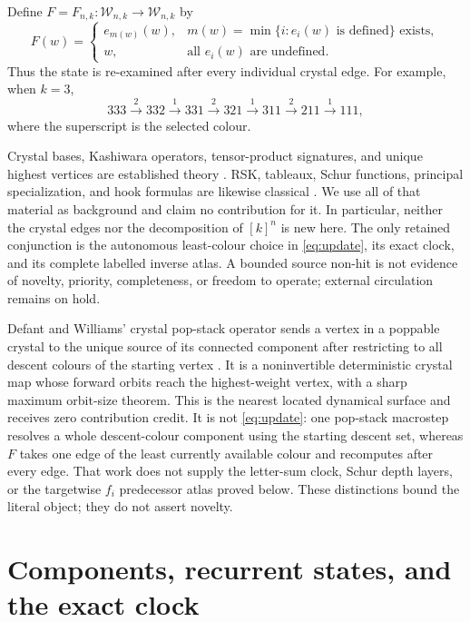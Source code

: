 \documentclass[a4paper,10pt]{amsart}
\theoremstyle{remark}
\newcommand{\Words}{\mathcal W}
\begin{document}
Define $F=F_{n,k}:\Words_{n,k}\to\Words_{n,k}$ by
\begin{equation}\label{eq:update}
 F(w)=
 \begin{cases}
 e_{m(w)}(w),&m(w)=\min\{i:e_i(w)\text{ is defined}\}\text{ exists},\\
 w,&\text{all }e_i(w)\text{ are undefined}.
 \end{cases}
\end{equation}
Thus the state is re-examined after every individual crystal edge.  For
example, when $k=3$,
\begin{equation}\label{eq:example}
333\xrightarrow{2}332\xrightarrow{1}331\xrightarrow{2}321
\xrightarrow{1}311\xrightarrow{2}211\xrightarrow{1}111,
\end{equation}
where the superscript is the selected colour.

Crystal bases, Kashiwara operators, tensor-product signatures, and unique
highest vertices are established theory
\cite{Kashiwara1991,BumpSchilling2017}.  RSK, tableaux, Schur functions,
principal specialization, and hook formulas are likewise classical
\cite{Fulton1997,Stanley2023,Sagan2001}.  We use all of that material as
background and claim no contribution for it.  In particular, neither the
crystal edges nor the decomposition of $[k]^n$ is new here.  The only retained
conjunction is the autonomous least-colour choice in \eqref{eq:update}, its
exact clock, and its complete labelled inverse atlas.  A bounded source
non-hit is not evidence of novelty, priority, completeness, or freedom to
operate; external circulation remains on hold.

Defant and Williams' crystal pop-stack operator sends a vertex in a poppable
crystal to the unique source of its connected component after restricting to
all descent colours of the starting vertex \cite{DefantWilliams2022}.  It is
a noninvertible deterministic crystal map whose forward orbits reach the
highest-weight vertex, with a sharp maximum orbit-size theorem.  This is the
nearest located dynamical surface and receives zero contribution credit.  It
is not \eqref{eq:update}: one pop-stack macrostep resolves a whole
descent-colour component using the starting descent set, whereas $F$ takes
one edge of the least currently available colour and recomputes after every
edge.  That work does not supply the letter-sum clock, Schur depth layers, or
the targetwise $f_i$ predecessor atlas proved below.  These distinctions
bound the literal object; they do not assert novelty.

\section{Components, recurrent states, and the exact clock}
\end{document}
